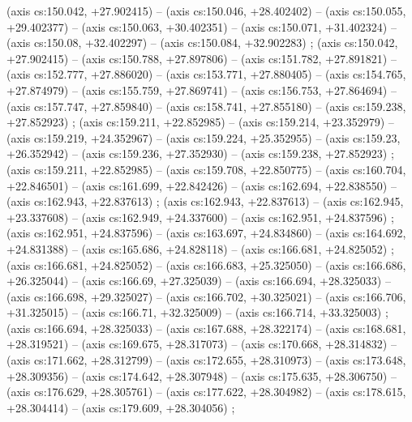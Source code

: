     (axis cs:150.042,    +27.902415) --  (axis cs:150.046,    +28.402402) --  (axis cs:150.055,    +29.402377) --  (axis cs:150.063,    +30.402351) --  (axis cs:150.071,    +31.402324) --  (axis cs:150.08,    +32.402297) --  (axis cs:150.084,    +32.902283) ;
    (axis cs:150.042,    +27.902415) --  (axis cs:150.788,    +27.897806) --  (axis cs:151.782,    +27.891821) --  (axis cs:152.777,    +27.886020) --  (axis cs:153.771,    +27.880405) --  (axis cs:154.765,    +27.874979) --  (axis cs:155.759,    +27.869741) --  (axis cs:156.753,    +27.864694) --  (axis cs:157.747,    +27.859840) --  (axis cs:158.741,    +27.855180) --  (axis cs:159.238,    +27.852923) ;
    (axis cs:159.211,    +22.852985) --  (axis cs:159.214,    +23.352979) --  (axis cs:159.219,    +24.352967) --  (axis cs:159.224,    +25.352955) --  (axis cs:159.23,    +26.352942) --  (axis cs:159.236,    +27.352930) --  (axis cs:159.238,    +27.852923) ;
    (axis cs:159.211,    +22.852985) --  (axis cs:159.708,    +22.850775) --  (axis cs:160.704,    +22.846501) --  (axis cs:161.699,    +22.842426) --  (axis cs:162.694,    +22.838550) --  (axis cs:162.943,    +22.837613) ;
    (axis cs:162.943,    +22.837613) --  (axis cs:162.945,    +23.337608) --  (axis cs:162.949,    +24.337600) --  (axis cs:162.951,    +24.837596) ;
    (axis cs:162.951,    +24.837596) --  (axis cs:163.697,    +24.834860) --  (axis cs:164.692,    +24.831388) --  (axis cs:165.686,    +24.828118) --  (axis cs:166.681,    +24.825052) ;
    (axis cs:166.681,    +24.825052) --  (axis cs:166.683,    +25.325050) --  (axis cs:166.686,    +26.325044) --  (axis cs:166.69,    +27.325039) --  (axis cs:166.694,    +28.325033) --  (axis cs:166.698,    +29.325027) --  (axis cs:166.702,    +30.325021) --  (axis cs:166.706,    +31.325015) --  (axis cs:166.71,    +32.325009) --  (axis cs:166.714,    +33.325003) ;
    (axis cs:166.694,    +28.325033) --  (axis cs:167.688,    +28.322174) --  (axis cs:168.681,    +28.319521) --  (axis cs:169.675,    +28.317073) --  (axis cs:170.668,    +28.314832) --  (axis cs:171.662,    +28.312799) --  (axis cs:172.655,    +28.310973) --  (axis cs:173.648,    +28.309356) --  (axis cs:174.642,    +28.307948) --  (axis cs:175.635,    +28.306750) --  (axis cs:176.629,    +28.305761) --  (axis cs:177.622,    +28.304982) --  (axis cs:178.615,    +28.304414) --  (axis cs:179.609,    +28.304056) ;
